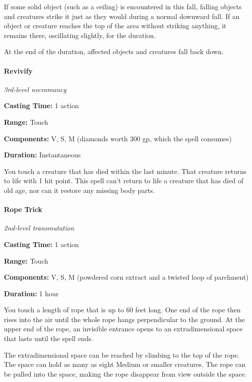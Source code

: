 \documentclass[
]{article}
\begin{document}
If some solid object (such as a ceiling) is encountered in this fall,
falling objects and creatures strike it just as they would during a
normal downward fall. If an object or creature reaches the top of the
area without striking anything, it remains there, oscillating slightly,
for the duration.

At the end of the duration, affected objects and creatures fall back
down.

\hypertarget{revivify}{%
\paragraph{Revivify}\label{revivify}}

\emph{3rd-level necromancy}

\textbf{Casting Time:} 1 action

\textbf{Range:} Touch

\textbf{Components:} V, S, M (diamonds worth 300 gp, which the spell
consumes)

\textbf{Duration:} Instantaneous

You touch a creature that has died within the last minute. That creature
returns to life with 1 hit point. This spell can't return to life a
creature that has died of old age, nor can it restore any missing body
parts.

\hypertarget{rope-trick}{%
\paragraph{Rope Trick}\label{rope-trick}}

\emph{2nd-level transmutation}

\textbf{Casting Time:} 1 action

\textbf{Range:} Touch

\textbf{Components:} V, S, M (powdered corn extract and a twisted loop
of parchment)

\textbf{Duration:} 1 hour

You touch a length of rope that is up to 60 feet long. One end of the
rope then rises into the air until the whole rope hangs perpendicular to
the ground. At the upper end of the rope, an invisible entrance opens to
an extradimensional space that lasts until the spell ends.

The extradimensional space can be reached by climbing to the top of the
rope. The space can hold as many as eight Medium or smaller creatures.
The rope can be pulled into the space, making the rope disappear from
view outside the space.
\end{document}
